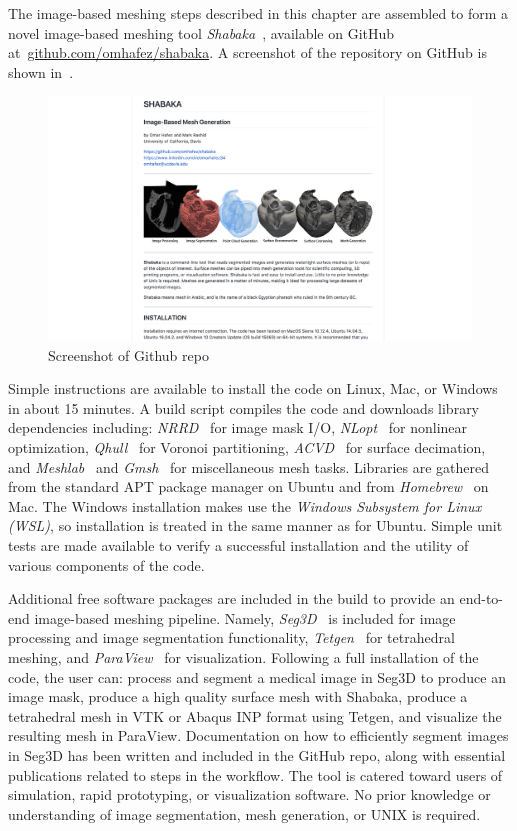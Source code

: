 The image-based meshing steps described in this chapter are assembled to form a novel image-based meshing tool \textit{Shabaka}~\cite{shab}, available on GitHub at~\url{github.com/omhafez/shabaka}. A screenshot of the repository on GitHub is shown in~.
\begin{figure}[ht!]
\centering
\vspace{2.5mm}
\includegraphics[width=1.0\textwidth]{media/2-shabaka/2-surf/7-shabaka.png}
\caption{Screenshot of Github repo}
\label{fig:github}
\end{figure}
Simple instructions are available to install the code on Linux, Mac, or Windows in about 15 minutes. A build script compiles the code and downloads library dependencies including: \textit{NRRD}~\cite{nrrd} for image mask I/O, \textit{NLopt}~\cite{nlo} for nonlinear optimization, \textit{Qhull}~\cite{barber_1996} for Voronoi partitioning, \textit{ACVD}~\cite{valette_2004} for surface decimation, and \textit{Meshlab}~\cite{meshlab} and \textit{Gmsh}~\cite{geuzaine_2009} for miscellaneous mesh tasks. Libraries are gathered from the standard APT package manager on Ubuntu and from \textit{Homebrew}~\cite{brew} on Mac. The Windows installation makes use the \textit{Windows Subsystem for Linux (WSL)}, so installation is treated in the same manner as for Ubuntu. Simple unit tests are made available to verify a successful installation and the utility of various components of the code.

Additional free software packages are included in the build to provide an end-to-end image-based meshing pipeline. Namely, \textit{Seg3D}~\cite{Seg3D} is included for image processing and image segmentation functionality, \textit{Tetgen}~\cite{tetgen} for tetrahedral meshing, and \textit{ParaView}~\cite{paraview} for visualization. Following a full installation of the code, the user can: process and segment a medical image in Seg3D to produce an image mask, produce a high quality surface mesh with Shabaka, produce a tetrahedral mesh in VTK or Abaqus INP format using Tetgen, and visualize the resulting mesh in ParaView. Documentation on how to efficiently segment images in Seg3D has been written and included in the GitHub repo, along with essential publications related to steps in the workflow. The tool is catered toward users of simulation, rapid prototyping, or visualization software. No prior knowledge or understanding of image segmentation, mesh generation, or UNIX is required.

